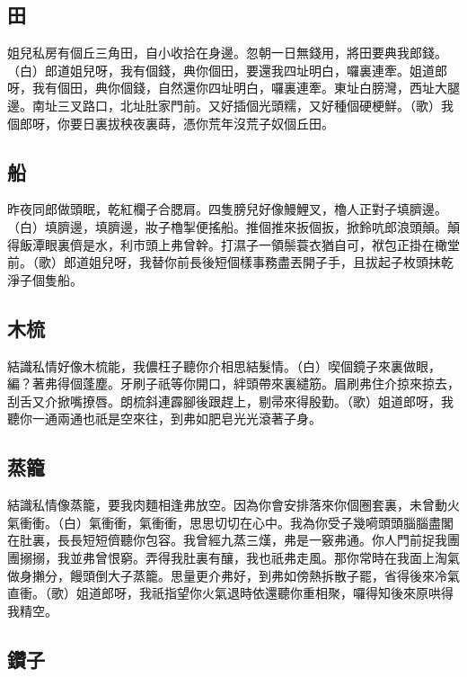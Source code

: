 \subsection*{田}

姐兒私房有個丘三角田，自小收拾在身邊。忽朝一日無錢用，將田要典我郎錢。（白）郎道姐兒呀，我有個錢，典你個田，要還我四址明白，囉裏連牽。姐道郎呀，我有個田，典你個錢，自然還你四址明白，囉裏連牽。東址白膀灣，西址大腿邊。南址三叉路口，北址肚家門前。又好插個光頭糯，又好種個硬梗鮮。（歌）我個郎呀，你要日裏拔秧夜裏蒔，憑你荒年沒荒子奴個丘田。

\subsection*{船}

昨夜同郎做頭眠，乾紅欄子合腮肩。四隻膀兒好像鰻鯉叉，櫓人正對子填臍邊。（白）填臍邊，填臍邊，妝子櫓掣便搖船。推個推來扳個扳，掀鈴吭郎浪頭顛。顛得飯潭眼裏儕是水，利市頭上弗曾幹。打濕子一領鬃蓑衣猶自可，袱包正掛在橄堂前。（歌）郎道姐兒呀，我替你前長後短個樣事務盡丟開子手，且拔起子枚頭抹乾淨子個隻船。

\subsection*{木梳}

結識私情好像木梳能，我儂枉子聽你介相思結髮情。（白）喫個鏡子來裏做眼，編？著弗得個蓬塵。牙刷子祇等你開口，絆頭帶來裏繾筋。眉刷弗住介掠來掠去，刮舌又介掀嘴撩唇。朗梳斜連霹腳後跟趕上，剔帚來得殷勤。（歌）姐道郎呀，我聽你一通兩通也祇是空來往，到弗如肥皂光光滾著子身。

\subsection*{蒸籠}

結識私情像蒸籠，要我肉麵相逢弗放空。因為你會安排落來你個圈套裏，未曾動火氣衝衝。（白）氣衝衝，氣衝衝，思思切切在心中。我為你受子幾嗬頭頭腦腦盡閣在肚裏，長長短短儕聽你包容。我曾經九蒸三熯，弗是一竅弗通。你人門前捉我團團搦搦，我並弗曾恨窮。弄得我肚裏有釀，我也祇弗走風。那你常時在我面上淘氣做身攋分，饅頭倒大子蒸籠。思量更介弗好，到弗如傍熱拆散子罷，省得後來冷氣直衝。（歌）姐道郎呀，我祇指望你火氣退時依還聽你重相聚，囉得知後來原哄得我精空。

\subsection*{鑽子}


